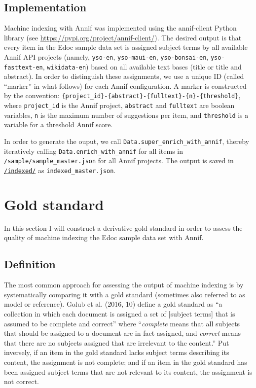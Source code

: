 \hypertarget{implementation}{%
\subsection{Implementation}\label{implementation}}

Machine indexing with Annif was implemented using the annif-client
Python library (see \url{https://pypi.org/project/annif-client/}). The
desired output is that every item in the Edoc sample data set is
assigned subject terms by all available Annif API projects (namely,
\texttt{yso-en}, \texttt{yso-maui-en}, \texttt{yso-bonsai-en},
\texttt{yso-fasttext-en}, \texttt{wikidata-en}) based on all available
text bases (title or title and abstract). In order to distinguish these
assignments, we use a unique ID (called ``marker'' in what follows) for
each Annif configuration. A marker is constructed by the convention:
\texttt{\{project\_id\}-\{abstract\}-\{fulltext\}-\{n\}-\{threshold\}},
where \texttt{project\_id} is the Annif project, \texttt{abstract} and
\texttt{fulltext} are boolean variables, \texttt{n} is the maximum
number of suggestions per item, and \texttt{threshold} is a variable for
a threshold Annif score.

In order to generate the ouput, we call
\texttt{Data.super\_enrich\_with\_annif}, thereby iteratively calling
\texttt{Data.enrich\_with\_annif} for all items in
\texttt{/sample/sample\_master.json} for all Annif projects. The output
is saved in
\href{https://github.com/MHindermann/mas/tree/main/files/indexed}{\texttt{/indexed/}}
as \texttt{indexed\_master.json}.

\hypertarget{gold-standard}{%
\section{Gold standard}\label{gold-standard}}

In this section I will construct a derivative gold standard in order to
assess the quality of machine indexing the Edoc sample data set with
Annif.

\hypertarget{definition}{%
\subsection{Definition}\label{definition}}

The most common approach for assessing the output of machine indexing is
by systematically comparing it with a gold standard (sometimes also
referred to as model or reference). Golub et al. (2016, 10) define a
gold standard as ``a collection in which each document is assigned a set
of {[}subject terms{]} that is assumed to be complete and correct''
where ``\emph{complete} means that all subjects that should be assigned
to a document are in fact assigned, and \emph{correct} means that there
are no subjects assigned that are irrelevant to the content.'' Put
inversely, if an item in the gold standard lacks subject terms
describing its content, the assignment is not complete; and if an item
in the gold standard has been assigned subject terms that are not
relevant to its content, the assignment is not correct.

